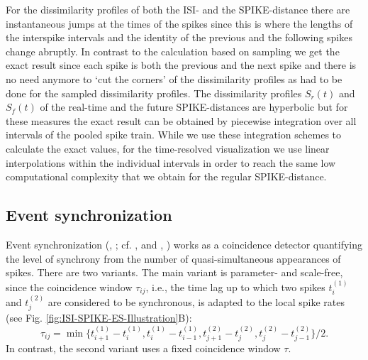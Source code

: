 \documentclass[10pt,twocolumn]{elsart5p}
\begin{document}
For the dissimilarity profiles of both the ISI- and the SPIKE-distance there are instantaneous jumps at the times of the spikes since this is where the lengths of the interspike intervals and the identity of the previous and the following spikes change abruptly. In contrast to the calculation based on sampling we get the exact result since each spike is both the previous and the next spike and there is no need anymore to `cut the corners' of the dissimilarity profiles as had to be done for the sampled dissimilarity profiles. The dissimilarity profiles $S_r(t)$ and $S_f (t)$ of the real-time and the future SPIKE-distances are hyperbolic but for these measures the exact result can be obtained by piecewise integration over all intervals of the pooled spike train. While we use these integration schemes to calculate the exact values, for the time-resolved visualization we use linear interpolations within the individual intervals in order to reach the same low computational complexity that we obtain for the regular SPIKE-distance.



\subsection{\label{ss:Event-Synchronization} Event synchronization}

Event synchronization (\citeauthor{QuianQuiroga02b}, \citeyear{QuianQuiroga02b}; cf. \citeauthor{Kreuz07c}, \citeyear{Kreuz07c} and \citeauthor{Kreuz11b}, \citeyear{Kreuz11b}) works as a coincidence detector quantifying the level of synchrony from the number of quasi-simultaneous appearances of spikes. There are two variants. The main variant is parameter- and scale-free, since the coincidence window $\tau_{ij}$, i.e., the time lag  up to which two spikes $t_i^{(1)}$ and $t_j^{(2)}$ are considered to be synchronous, is adapted to the local spike rates (see Fig. \ref{fig:ISI-SPIKE-ES-Illustration}B):
%
\begin{equation} \label{eq:Event-MaxDist}
    \tau_{ij} = \min \{t_{i+1}^{(1)} - t_i^{(1)}, t_i^{(1)} - t_{i-1}^{(1)},
                           t_{j+1}^{(2)} - t_j^{(2)}, t_j^{(2)} - t_{j-1}^{(2)}\}/2.
\end{equation}
%
In contrast, the second variant uses a fixed coincidence window $\tau$.
\end{document}
